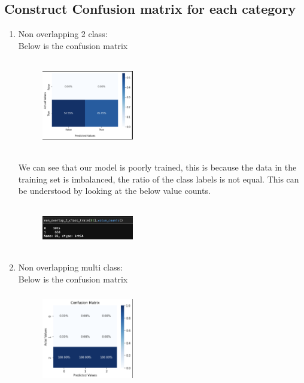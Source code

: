 \documentclass[conference]{IEEEtran}
\begin{document}
\subsection{Construct Confusion matrix for each category}
\begin{enumerate}
\item
Non overlapping 2 class: \\
Below is the confusion matrix \\
\begin{figure}[!htbp]
    \centering
    \includegraphics[width=4cm, height=4cm]{task2.9.png}
    \label{fig:my_label}
\end{figure}
We can see that our model is poorly trained, this is because the data in the training set is imbalanced, the ratio of the class labels is not equal. This can be understood by looking at the below value counts. \\
\begin{figure}[!htbp]
    \centering
    \includegraphics[width=4cm, height=2cm]{task2.13.png}
    \label{fig:my_label}
\end{figure}
\item
Non overlapping multi class: \\
Below is the confusion matrix \\
\begin{figure}[!htbp]
    \centering
    \includegraphics[width=4cm, height=4cm]{task2.10.png}
    \label{fig:my_label}
\end{figure}

\end{enumerate}
\end{document}
